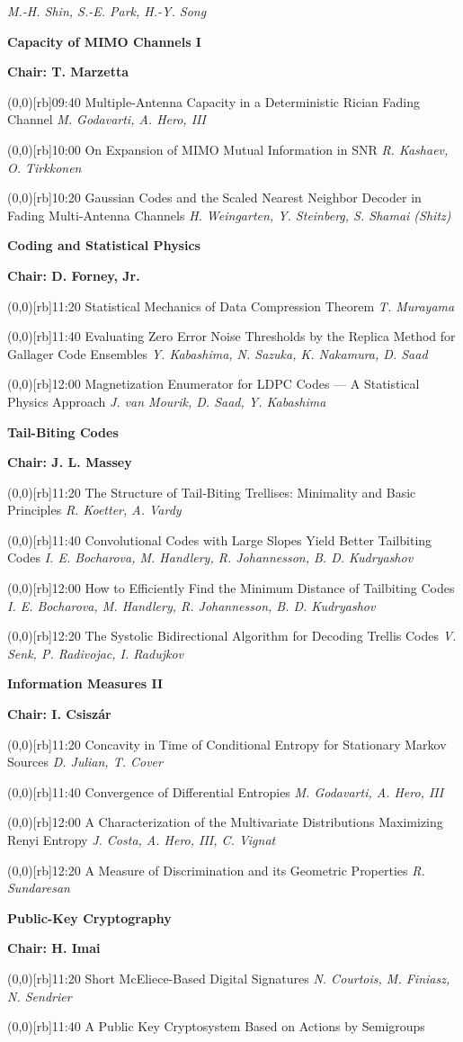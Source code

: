 \documentclass[a5paper,twoside]{article}
\def\period#1{\flushleft{\large\bfseries #1}\markboth{\sf #1}{\sf #1}}
\def\sesstitle#1{\vspace{.45\bigskipamount}\par{\bfseries #1}\par}
\def\sesschair#1{{\bfseries Chair: #1}\par\vspace{.65\medskipamount}}
\def\papertime#1{\makebox(0,0)[rb]{{\scriptsize #1}\hspace{.5em}}}
\def\papertitle#1{#1\hfil\break}
\def\paperauthors#1{{\itshape #1}\par\filbreak\vspace{.65\medskipamount}}
\begin{document}
\paperauthors{M.-H. Shin, S.-E. Park, H.-Y. Song}
\sesstitle{Capacity of MIMO Channels I}
\sesschair{T. Marzetta}
\papertime{09:40}%
\papertitle{Multiple-Antenna Capacity in a Deterministic Rician Fading Channel}
\paperauthors{M. Godavarti, A. Hero, III}
\papertime{10:00}%
\papertitle{On Expansion of MIMO Mutual Information in SNR}
\paperauthors{R. Kashaev, O. Tirkkonen}
\papertime{10:20}%
\papertitle{Gaussian Codes and the Scaled Nearest Neighbor Decoder in Fading Multi-Antenna Channels}
\paperauthors{H. Weingarten, Y. Steinberg, S. Shamai (Shitz)}
\period{Wed 11:20 -- 12:40}
\sesstitle{Coding and Statistical Physics}
\sesschair{D. Forney, Jr.}
\papertime{11:20}%
\papertitle{Statistical Mechanics of Data Compression Theorem}
\paperauthors{T. Murayama}
\papertime{11:40}%
\papertitle{Evaluating Zero Error Noise Thresholds by the Replica Method for Gallager Code Ensembles}
\paperauthors{Y. Kabashima, N. Sazuka, K. Nakamura, D. Saad}
\papertime{12:00}%
\papertitle{Magnetization Enumerator for LDPC Codes --- A Statistical Physics Approach}
\paperauthors{J. van Mourik, D. Saad, Y. Kabashima}
\sesstitle{Tail-Biting Codes}
\sesschair{J. L. Massey}
\papertime{11:20}%
\papertitle{The Structure of Tail-Biting Trellises: Minimality and Basic Principles}
\paperauthors{R. Koetter, A. Vardy}
\papertime{11:40}%
\papertitle{Convolutional Codes with Large Slopes Yield Better Tailbiting Codes}
\paperauthors{I. E. Bocharova, M. Handlery, R. Johannesson, B. D. Kudryashov}
\papertime{12:00}%
\papertitle{How to Efficiently Find the Minimum Distance of Tailbiting Codes}
\paperauthors{I. E. Bocharova, M. Handlery, R. Johannesson, B. D. Kudryashov}
\papertime{12:20}%
\papertitle{The Systolic Bidirectional Algorithm for Decoding Trellis Codes}
\paperauthors{V. Senk, P. Radivojac, I. Radujkov}
\sesstitle{Information Measures II}
\sesschair{I. Csisz\'ar}
\papertime{11:20}%
\papertitle{Concavity in Time of Conditional Entropy for Stationary Markov Sources}
\paperauthors{D. Julian, T. Cover}
\papertime{11:40}%
\papertitle{Convergence of Differential Entropies}
\paperauthors{M. Godavarti, A. Hero, III}
\papertime{12:00}%
\papertitle{A Characterization of the Multivariate Distributions Maximizing Renyi Entropy}
\paperauthors{J. Costa, A. Hero, III, C. Vignat}
\papertime{12:20}%
\papertitle{A Measure of Discrimination and its Geometric Properties}
\paperauthors{R. Sundaresan}
\sesstitle{Public-Key Cryptography}
\sesschair{H. Imai}
\papertime{11:20}%
\papertitle{Short McEliece-Based Digital Signatures}
\paperauthors{N. Courtois, M. Finiasz, N. Sendrier}
\papertime{11:40}%
\papertitle{A Public Key Cryptosystem Based on Actions by Semigroups}
\end{document}
